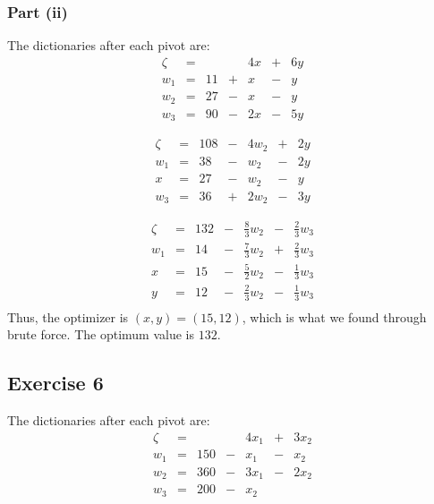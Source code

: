 \documentclass[letterpaper,12pt]{article}
\theoremstyle{definition}
\begin{document}
\subsubsection*{Part (ii)}
The dictionaries after each pivot are:
\begin{equation*}
\begin{matrix}
\zeta &= & & & 4x &+& 6y \\
\hline
w_1 &= &11 &+& x &-& y\\
w_2 &= &27 &-& x &-& y \\
w_3 &= &90 &- & 2x &-& 5y
\end{matrix}
\end{equation*}

\begin{equation*}
\begin{matrix}
\zeta &= &108 &-& 4w_2 &+& 2y \\
\hline
w_1 &= &38 &-& w_2 &-&2y\\
x &= &27 &-& w_2 &-& y \\
w_3 &= &36 &+ & 2w_2 &-& 3y
\end{matrix}
\end{equation*}

\begin{equation*}
\begin{matrix}
\zeta &= &132 &-& \frac{8}{3} w_2 &-& \frac{2}{3} w_3 \\
\hline
w_1 &= &14 &-& \frac{7}{3} w_2 &+& \frac{2}{3}w_3 \\
x &= &15 &-& \frac{5}{2} w_2 &-& \frac{1}{3} w_3 \\
y &= &12 &-& \frac{2}{3}w_2 &-& \frac{1}{3}w_3 \\
\end{matrix}
\end{equation*}
Thus, the optimizer is $(x,y) = (15,12)$, which is what we found through brute force. The optimum value is $132$. 

\subsection*{Exercise 6}
The dictionaries after each pivot are:
\begin{equation*}
\begin{matrix}
\zeta &= & & & 4x_1 &+& 3x_2 \\
\hline
w_1 &= &150 &-& x_1 &-& x_2\\
w_2 &= &360 &-& 3x_1 &-& 2x_2 \\
w_3 &= &200&- & x_2 & &
\end{matrix}
\end{equation*}
\end{document}
